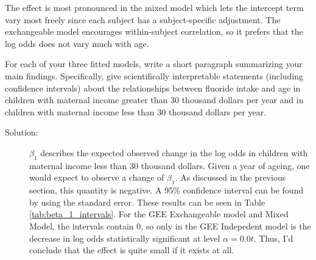 \documentclass[11pt, letterpaper]{article}
\begin{document}
\begin{enumerate}[(a)]
\begin{description}
  The effect is most pronounced in the mixed model which lets the intercept term
  vary most freely since each subject has a subject-specific adjustment. The
  exchangeable model encourages within-subject correlation, so it prefers that
  the log odds does not vary much with age.
\end{description}
{\em \item For each of your three fitted models, write a short paragraph summarizing your main findings.  Specifically, give scientifically interpretable statements (including confidence intervals) about the relationships between fluoride intake and age
in children with maternal income greater than 30 thousand dollars per year and
in children with maternal income less than 30 thousand dollars per year.}
\begin{description}
  
  
\item[Solution:] $\beta_1$ describes the expected observed change in the log
  odds in children with maternal income less than 30 thousand dollars. Given a
  year of ageing, one would expect to observe a change of $\beta_1$. As
  discussed in the previous section, this quantity is negative. A 95\%
  confidence interval can be found by using the standard error. These results
  can be seen in Table \ref{tab:beta_1_intervals}. For the GEE Exchangeable
  model and Mixed Model, the intervals contain $0$, so only in the GEE
  Indepedent model is the decrease in log odds statistically significant at
  level $\alpha = 0.0t$. Thus, I'd conclude that the effect is quite small if it
  exists at all.


\end{description}
\end{enumerate}
\end{document}
